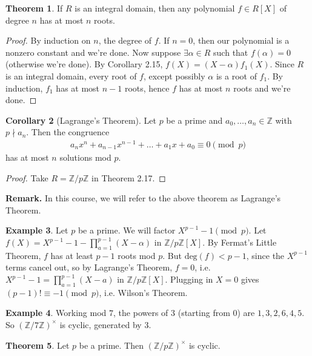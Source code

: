 \documentclass{article}
\theoremstyle{definition}
\newtheorem{theorem}{Theorem}[section]
\newtheorem{cor}[theorem]{Corollary}
\newtheorem{example}[theorem]{Example}
\theoremstyle{remark}
\begin{document}
\begin{theorem} %
    If $R$ is an integral domain, then any polynomial $f \in R[X]$ of degree $n$ has at most $n$ roots.
\end{theorem}
\begin{proof}
    By induction on $n$, the degree of $f$. If $n=0$, then our polynomial is a nonzero constant and we're done. Now suppose $\exists \alpha \in R$ such that $f(\alpha)=0$ (otherwise we're done). By Corollary 2.15, $f(X) = (X-\alpha)f_1(X)$. Since $R$ is an integral domain, every root of $f$, except possibly $\alpha$ is a root of $f_1$. By induction, $f_1$ has at most $n-1$ roots, hence $f$ has at most $n$ roots and we're done.
\end{proof}
\begin{cor}[Lagrange's Theorem]
    Let $p$ be a prime and $a_0,\ldots,a_n \in \mathbb{Z}$ with $p \nmid a_n$. Then the congruence 
    \begin{align*}
        a_nx^n + a_{n-1}x^{n-1} + \ldots + a_1x + a_0 \equiv 0 \pmod{p}
    \end{align*}
    has at most $n$ solutions mod $p$.
\end{cor}
\begin{proof}
    Take $R=\mathbb{Z}/p\mathbb{Z}$ in Theorem 2.17.
\end{proof}
\textbf{Remark.} In this course, we will refer to the above theorem as Lagrange's Theorem.
\begin{example}
    Let $p$ be a prime. We will factor $X^{p-1}- 1 \pmod{p}$. Let $f(X) = X^{p-1}-1 - \prod_{a=1}^{p-1}(X-\alpha)$ in $\mathbb{Z}/p\mathbb{Z}[X]$. By Fermat's Little Theorem, $f$ has at least $p-1$ roots mod $p$. But $\text{deg}(f) < p-1$, since the $X^{p-1}$ terms cancel out, so by Lagrange's Theorem, $f = 0$, i.e. $X^{p-1} -1 = \prod_{a=1}^{p-1} (X-a)$ in $\mathbb{Z}/p\mathbb{Z}[X]$. Plugging in $X=0$ gives $(p-1)! \equiv -1 \pmod{p}$, i.e. Wilson's Theorem.
\end{example}
\begin{example}
    Working mod $7$, the powers of $3$ (starting from 0) are $1,3,2,6,4,5$. So $(\mathbb{Z}/7\mathbb{Z})^{\times}$ is cyclic, generated by $3$.
\end{example}
\begin{theorem}%
    Let $p$ be a prime. Then $(\mathbb{Z}/p\mathbb{Z})^{\times}$ is cyclic.
\end{theorem}
\end{document}
